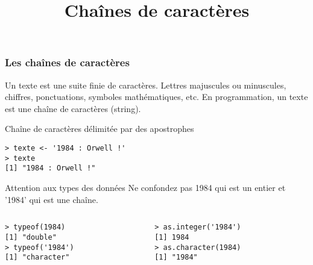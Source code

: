 \documentclass[10pt]{beamer}
\title{Chaînes de caractères}
\begin{document}
\maketitle


\begin{frame}[fragile]
  \frametitle{Les chaînes de caractères}
  \begin{block}{Un texte est une suite finie de caractères.}
    Lettres majuscules ou minuscules, chiffres, ponctuations, symboles mathématiques, etc.
    En programmation, un texte est une chaîne de caractères (\alert{string}).
  \end{block}

\begin{block}{Chaîne de caractères délimitée par des apostrophes}
  \begin{lstlisting}[style=edblock]
> texte <- '1984 : Orwell !'
> texte
[1] "1984 : Orwell !"
  \end{lstlisting}
\end{block}

\begin{exampleblock}{Attention aux types des données}
  Ne confondez pas 1984 qui est un entier et '1984' qui est une chaîne.
  \begin{columns}[t]
    \begin{column}{0.48\textwidth}
      \begin{lstlisting}
> typeof(1984)
[1] "double"
> typeof('1984')
[1] "character"
      \end{lstlisting}
\end{column}
\begin{column}{0.48\textwidth}
  \begin{lstlisting}
> as.integer('1984')
[1] 1984
> as.character(1984)
[1] "1984"
  \end{lstlisting}
\end{column}
\end{columns}

\end{exampleblock}
\end{frame}
\end{document}
